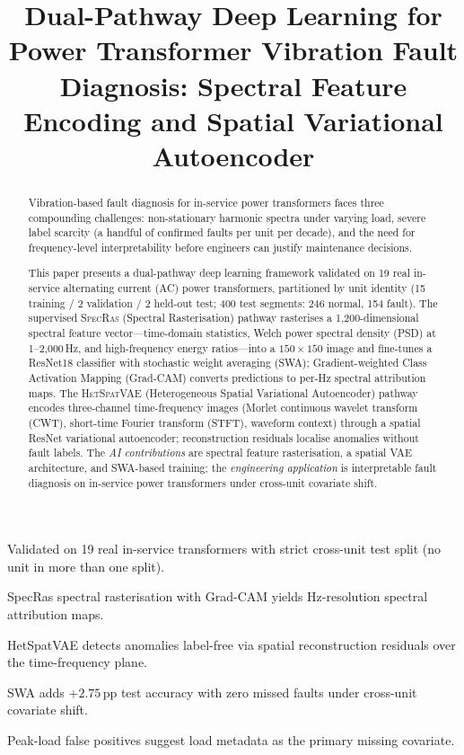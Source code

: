 \documentclass[preprint,12pt,3p]{elsarticle}
\newcommand{\zerone}{\textsc{SpecRas}\xspace}      %
\newcommand{\hetspatvae}{\textsc{HetSpatVAE}\xspace} %
\newcommand{\hczv}{\hetspatvae}                    %
\begin{document}
\begin{frontmatter}

\title{Dual-Pathway Deep Learning for Power Transformer Vibration Fault
       Diagnosis: Spectral Feature Encoding and Spatial Variational
       Autoencoder}

\begin{highlights}
\item Validated on 19 real in-service transformers with strict
      cross-unit test split (no unit in more than one split).
\item SpecRas spectral rasterisation with Grad-CAM yields
      Hz-resolution spectral attribution maps.
\item HetSpatVAE detects anomalies label-free via spatial
      reconstruction residuals over the time-frequency plane.
\item SWA adds $+2.75$\,pp test accuracy with zero missed faults
      under cross-unit covariate shift.
\item Peak-load false positives suggest load metadata as the
      primary missing covariate.
\end{highlights}

\begin{abstract}
\indent Vibration-based fault diagnosis for in-service power transformers faces
three compounding challenges: non-stationary harmonic spectra under
varying load, severe label scarcity (a handful of confirmed faults per
unit per decade), and the need for frequency-level interpretability
before engineers can justify maintenance decisions.

This paper presents a dual-pathway deep learning framework validated on
19 real in-service alternating current (AC) power transformers,
partitioned by unit identity (15 training / 2 validation / 2 held-out
test; 400 test segments: 246 normal, 154 fault).
The supervised \zerone{} (Spectral Rasterisation) pathway rasterises a
1{,}200-dimensional spectral feature vector---time-domain statistics,
Welch power spectral density (PSD) at 1--2{,}000\,Hz, and
high-frequency energy ratios---into a $150{\times}150$ image and
fine-tunes a ResNet18 classifier with stochastic weight averaging (SWA);
Gradient-weighted Class Activation Mapping (Grad-CAM) converts
predictions to per-Hz spectral attribution maps.
The \hczv{} (Heterogeneous Spatial Variational Autoencoder) pathway
encodes three-channel time-frequency images (Morlet continuous wavelet
transform (CWT), short-time Fourier transform (STFT), waveform context)
through a spatial ResNet variational autoencoder; reconstruction
residuals localise anomalies without fault labels.
The \textit{AI contributions} are spectral feature rasterisation,
a spatial VAE architecture, and SWA-based training; the
\textit{engineering application} is interpretable fault diagnosis on
in-service power transformers under cross-unit covariate shift.


\end{abstract}
\end{frontmatter}
\end{document}
